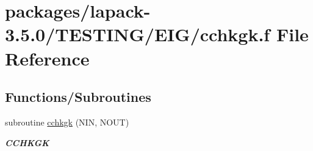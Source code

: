 \hypertarget{cchkgk_8f}{}\section{packages/lapack-\/3.5.0/\+T\+E\+S\+T\+I\+N\+G/\+E\+I\+G/cchkgk.f File Reference}
\label{cchkgk_8f}
\subsection*{Functions/\+Subroutines}
\begin{DoxyCompactItemize}
\item 
subroutine \hyperlink{group__complex__eig_ga38c55aad209e2f68c34d7959912ee253}{cchkgk} (N\+I\+N, N\+O\+U\+T)
\begin{DoxyCompactList}\small\item\em {\bfseries C\+C\+H\+K\+G\+K} \end{DoxyCompactList}\end{DoxyCompactItemize}
